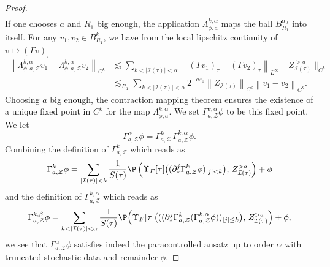 \documentclass[11pt]{preprint}
\newcommand{\mcI}{\mathcal{I}}
\newcommand{\mcZ}{\mathcal{Z}}
\newcounter{theorem}
\def\eps{\varepsilon}
\let\eps\varepsilon
\newcommand{\norme}[1]{\left\lVert #1 \right\lVert}
\begin{document}
\begin{proof}
\begin{align*}
		\end{align*}
		If one chooses $a$ and $R_1$ big enough, the application $\Lambda^{k,\alpha}_{\phi,a}$ maps the ball $B_{R_1}^{\alpha_0}$ into itself. For any $v_1,v_2\in B_{R_1}^{k}$, we have from the local  lipschitz continuity of $v\mapsto(\Gamma v)_\tau$  
		\begin{align*}
			\norme{ \Lambda_{\phi,a,\mcZ}^{k,\alpha} v_1 - \Lambda_{\phi,a,\mcZ}^{k,\alpha} v_2    }_{C^{k}} &\lesssim \sum_{k<|\mcI(\tau)|<\alpha} \norme{(\Gamma v_1)_\tau-(\Gamma v_2)_\tau}_{L^\infty} \lVert Z_{\mcI(\tau)}^{> a}\lVert_{C^{k}}
			\\
			&\lesssim_{R_1} \sum_{k<|\mcI(\tau)|<\alpha}  2^{-a\eps_0}\norme{Z_{\mcI(\tau)}}_{C^{k}} \norme{v_1-v_2}_{C^{k}} .
		\end{align*}
			Choosing $a$ big enough, the contraction mapping theorem ensures the existence of a unique fixed point in $C^{k}$ for the map $\Lambda_{\phi,a}^{k,\alpha}$. We set $\Gamma^{k,\alpha}_{a,\mcZ} \phi$ to be this fixed point. We let 
			$$
		\Gamma^{\alpha}_{a,\mcZ} \phi = \Gamma^k_{a,\mcZ} \,\Gamma^{k,\alpha}_{a,\mcZ}  \phi.
		$$
		Combining the definition of $\Gamma^k_{a,\mcZ}$ which reads as
		\begin{equation*}
			\Gamma^k_{a,\mcZ} \phi = \sum_{|\mcI(\tau)|<k } \frac{1}{S(\tau)}\P\left( \Upsilon_F[\tau]\big( ( \partial^j_*\Gamma^k_{a,\mcZ} \phi)_{|j|<k} \big) , \,   Z_{\mcI(\tau)}^{>a}  \right) + \phi
		\end{equation*}
		 and the definition of $\Gamma^{k,\alpha}_{a,\mcZ}$ which reads as 
		 $$
		 \Gamma^{k,\beta}_{a,\mcZ}\phi = \sum_{k<|\mcI(\tau)|<\alpha} \frac{1}{S(\tau)}  \P \Big( \Upsilon_F[\tau]\big(((\partial^j_*\Gamma_{a,\mcZ}^k(\Gamma^{k,\alpha}_{a,\mcZ}\phi))_{|j|\leq k} \big) , \, Z_{\mcI(\tau)}^{>a} \Big) +  \phi ,
		 $$ 
		 we see that $\Gamma^{\alpha}_{a,\mcZ} \phi$ satisfies indeed the paracontrolled ansatz up to order $\alpha$ with truncated stochastic data and remainder $\phi$.
	\end{proof}
	
	
	
	
		
\end{document}
